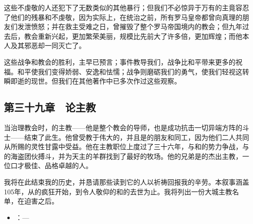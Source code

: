这些不虔敬的人还犯下了无数类似的其他暴行；但我们不必惊异于万有的主竟容忍了他们的残暴和不虔敬，因为实际上，在统治之前，所有罗马皇帝都曾向真理的朋友们发泄愤怒；并在救主受难之日，曾摧毁了整个罗马帝国境内的教会；但九年过去后，教会重新兴起，更加繁荣美丽，规模比先前大了许多倍，更加辉煌；而他本人及其邪恶却一同灭亡了。\par

这些战争和教会的胜利，主早已预言；事件教导我们，战争比和平带来更多的祝福。和平使我们变得娇弱、安逸和怯懦；战争则磨砺我们的勇气，使我们轻视这转瞬即逝的现世。但我们在其他著作中已多次作过这些观察。\par


\subsection{第三十九章　论主教}

当治理教会时，的主教——他是整个教会的导师，也是成功抗击一切异端方阵的斗士——结束了此生。他曾受教于伟大的，并且是的朋友和同工，因为他们二人共同从所赐的灵性甘露中受益。他在主教职位上度过了三十六年，与和的势力争战，与的海盗团伙搏斗，并为天主的羊群找到了最好的牧场。他的兄弟是的杰出主教，一位口才极佳、品格卓越的人。\par

我将在此结束我的历史，并恳请那些读到它的人以祈祷回报我的辛劳。本叙事涵盖105年，从的疯狂开始，到令人敬仰的和的去世为止。我将列出一份大城主教名单，在迫害之后。\par

\par

\begin{itemize}
\item {}：—
\end{itemize}

